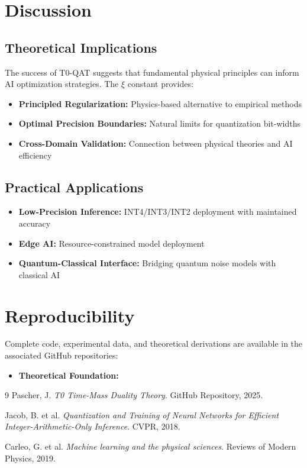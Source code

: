 	\section{Discussion}
	
	\subsection{Theoretical Implications}
	
	The success of T0-QAT suggests that fundamental physical principles can inform AI optimization strategies. The $\xi$ constant provides:
	
	\begin{itemize}
		\item \textbf{Principled Regularization:} Physics-based alternative to empirical methods
		\item \textbf{Optimal Precision Boundaries:} Natural limits for quantization bit-widths
		\item \textbf{Cross-Domain Validation:} Connection between physical theories and AI efficiency
	\end{itemize}
	
	\subsection{Practical Applications}
	
	\begin{itemize}
		\item \textbf{Low-Precision Inference:} INT4/INT3/INT2 deployment with maintained accuracy
		\item \textbf{Edge AI:} Resource-constrained model deployment
		\item \textbf{Quantum-Classical Interface:} Bridging quantum noise models with classical AI
	\end{itemize}
	
	\section*{Reproducibility}
	
	Complete code, experimental data, and theoretical derivations are available in the associated GitHub repositories:
	
	\begin{itemize}
		\item \textbf{Theoretical Foundation:} 
	\end{itemize}
	
	\begin{thebibliography}{9}
		Pascher, J. \textit{T0 Time-Mass Duality Theory}. 
		GitHub Repository, 2025.
		
		Jacob, B. et al. \textit{Quantization and Training of Neural Networks for Efficient Integer-Arithmetic-Only Inference}. 
		CVPR, 2018.
		
		Carleo, G. et al. \textit{Machine learning and the physical sciences}. 
		Reviews of Modern Physics, 2019.
	\end{thebibliography}
	
